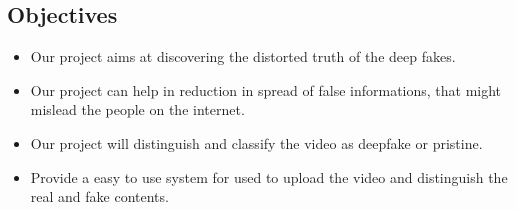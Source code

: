 \subsection{Objectives}
\justify
\begin{itemize}
    \item Our project aims at discovering the distorted truth of the deep fakes.
    \item Our project can help in  reduction in spread of false informations, that might mislead the people on the internet.
    \item Our project will distinguish and classify the video as deepfake or pristine.
    \item Provide a easy to use system for used to upload the video and distinguish the real and fake contents.
\end{itemize}
